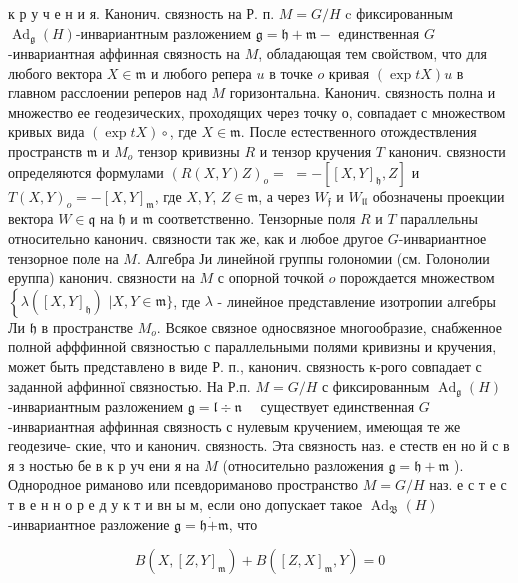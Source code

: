 \documentclass[10pt]{article}
\begin{document}
к р у ч е н и я. Канонич. связность на Р. п. $M=G / H$ c фиксированным $\operatorname{Ad}_{\mathfrak{g}}(H)$-инвариантным разложением $\mathfrak{g}=\mathfrak{h}+\mathfrak{m}-$ единственная $G$-инвариантная аффинная связность на $M$, обладающая тем свойством, что для любого вектора $X \in \mathfrak{m}$ и любого репера $u$ в точке $o$ кривая $(\exp t X) u$ в главном расслоении реперов над $M$ горизонтальна. Канонич. связность полна и множество ее геодезических, проходящих через точку о, совпадает с множеством кривых вида $(\exp t X) \circ$, где $X \in \mathfrak{m}$. После естественного отождествления пространств $\mathfrak{m}$ и $M_{o}$ тензор кривизны $R$ и тензор кручения $T$ канонич. связности определяются формулами $(R(X, Y) Z)_{o}=$ $=-\left[[X, Y]_{\mathfrak{h}}, Z\right]$ и $T(X, Y)_{o}=-[X, Y]_{\mathfrak{m}}$, где $X, Y$, $Z \in \mathfrak{m}$, а через $W_{\mathfrak{f}}$ и $W_{\mathfrak{l l}}$ обозначены проекции вектора $W \in \mathfrak{q}$ на $\mathfrak{h}$ и $\mathfrak{m}$ соответственно. Тензорные поля $R$ и $T$ параллельны относительно канонич. связности так же, как и любое другое $G$-инвариантное тензорное поле на $M$. Алгебра Ји линейной группы голономии (см. Голонолии еруппа) канонич. связности на $M$ с опорной точкой $o$ порождается множеством $\left\{\lambda\left([X, Y]_{\mathfrak{h}}\right)\right.$ $\mid X, Y \in \mathfrak{m}\}$, где $\lambda$ - линейное представление изотропии алгебры Ли $\mathfrak{h}$ в пространстве $M_{o}$. Всякое связное односвязное многообразие, снабженное полной афффинной связностью с параллельными полями кривизны и кручения, может быть представлено в виде Р. п., канонич. связность к-рого совпадает с заданной аффинної связностью. На Р.п. $M=G / H$ с фиксированным $\operatorname{Ad}_{\mathfrak{g}}(H)$-инвариантным разложением $\mathfrak{g}=\mathfrak{l} \div \mathfrak{n} \quad$ существует единственная $G$-инвариантная аффинная связность с нулевым кручением, имеющая те же геодезиче- ские, что и канонич. связность. Эта связность наз. е стеств ен но й с в я з ностью бе в к р уч ени я на $M$ (относительно разложения $\mathfrak{g}=\mathfrak{h}+\mathfrak{m}$ ). Однородное риманово или псевдориманово пространство $M=G / H$ наз. е с т е с т в е н н о р е д у к т и вн ы м, если оно допускает такое $\operatorname{Ad}_{\mathfrak{B}}(H)$-инвариантное разложение $\mathfrak{g}=\mathfrak{h} \dot{+} \mathfrak{m}$, что



\[

B\left(X,[Z, Y]_{\mathfrak{m}}\right)+B\left([Z, X]_{\mathfrak{m}}, Y\right)=0

\]
\end{document}
